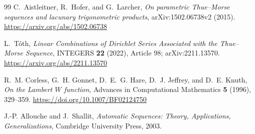 \documentclass[11pt,oneside]{article}
\numberwithin{equation}{section}
\theoremstyle{definition}
\theoremstyle{remark}
\begin{document}
\begin{thebibliography}{99}
C.~Aistleitner, R.~Hofer, and G.~Larcher,
\emph{On parametric Thue--Morse sequences and lacunary trigonometric products},
arXiv:1502.06738v2 (2015).
\url{https://arxiv.org/abs/1502.06738}

L.~T\'oth,
\emph{Linear Combinations of Dirichlet Series Associated with the Thue--Morse Sequence},
INTEGERS \textbf{22} (2022), Article 98; arXiv:2211.13570.
\url{https://arxiv.org/abs/2211.13570}

R.~M. Corless, G.~H. Gonnet, D.~E.~G. Hare, D.~J. Jeffrey, and D.~E. Knuth,
\emph{On the Lambert $W$ function}, Advances in Computational Mathematics \textbf{5} (1996),
329--359.
\url{https://doi.org/10.1007/BF02124750}

J.-P. Allouche and J.~Shallit,
\emph{Automatic Sequences: Theory, Applications, Generalizations}, Cambridge University
Press, 2003.

\end{thebibliography}
\end{document}
